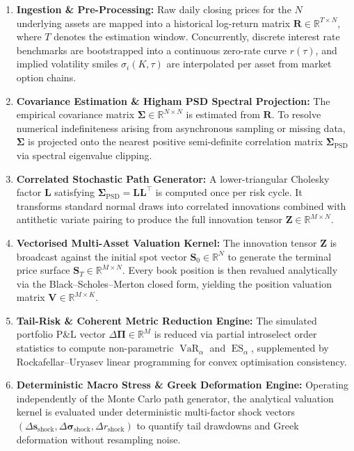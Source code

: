 \documentclass{article}
\theoremstyle{plain}
\theoremstyle{definition}
\theoremstyle{remark}
\DeclareMathOperator{\VaR}{VaR}
\DeclareMathOperator{\ES}{ES}
\begin{document}
\begin{enumerate}
    \item \textbf{Ingestion \& Pre-Processing:} Raw daily closing prices for the $N$ underlying assets are mapped into a historical log-return matrix $\mathbf{R} \in \mathbb{R}^{T \times N}$, where $T$ denotes the estimation window. Concurrently, discrete interest rate benchmarks are bootstrapped into a continuous zero-rate curve $r(\tau)$, and implied volatility smiles $\sigma_i(K, \tau)$ are interpolated per asset from market option chains.
    \item \textbf{Covariance Estimation \& Higham PSD Spectral Projection:} The empirical covariance matrix $\mathbf{\Sigma} \in \mathbb{R}^{N \times N}$ is estimated from $\mathbf{R}$. To resolve numerical indefiniteness arising from asynchronous sampling or missing data, $\mathbf{\Sigma}$ is projected onto the nearest positive semi-definite correlation matrix $\mathbf{\Sigma}_{\text{PSD}}$ via spectral eigenvalue clipping.
    \item \textbf{Correlated Stochastic Path Generator:} A lower-triangular Cholesky factor $\mathbf{L}$ satisfying $\mathbf{\Sigma}_{\text{PSD}} = \mathbf{L}\mathbf{L}^\top$ is computed once per risk cycle. It transforms standard normal draws into correlated innovations combined with antithetic variate pairing to produce the full innovation tensor $\mathbf{Z} \in \mathbb{R}^{M \times N}$.
    \item \textbf{Vectorised Multi-Asset Valuation Kernel:} The innovation tensor $\mathbf{Z}$ is broadcast against the initial spot vector $\mathbf{S}_0 \in \mathbb{R}^N$ to generate the terminal price surface $\mathbf{S}_T \in \mathbb{R}^{M \times N}$. Every book position is then revalued analytically via the Black--Scholes--Merton closed form, yielding the position valuation matrix $\mathbf{V} \in \mathbb{R}^{M \times K}$.
    \item \textbf{Tail-Risk \& Coherent Metric Reduction Engine:} The simulated portfolio P\&L vector $\Delta \boldsymbol{\Pi} \in \mathbb{R}^M$ is reduced via partial introselect order statistics to compute non-parametric $\VaR_\alpha$ and $\ES_\alpha$, supplemented by Rockafellar--Uryasev linear programming for convex optimisation consistency.
    \item \textbf{Deterministic Macro Stress \& Greek Deformation Engine:} Operating independently of the Monte Carlo path generator, the analytical valuation kernel is evaluated under deterministic multi-factor shock vectors $(\Delta \mathbf{s}_{\text{shock}}, \Delta \boldsymbol{\sigma}_{\text{shock}}, \Delta r_{\text{shock}})$ to quantify tail drawdowns and Greek deformation without resampling noise.
\end{enumerate}
\end{document}
